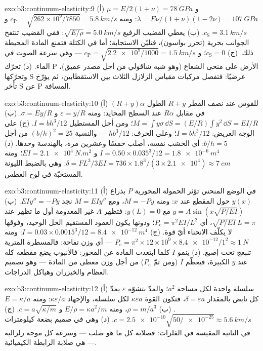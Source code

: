 \begin{solution}{exo:b3:continuum-elasticity:9}
(أ) $\mu = E/2(1+\nu) = \qty{78}{GPa}$ و $\lambda = E\nu/(1+\nu)(1-2\nu)
= \qty{107}{GPa}$: ومنه $c_{\text{P}} = \sqrt{262\times10^9/7850} =
\qty{5.8}{km/s}$ و $c_{\text{S}} = \qty{3.1}{km/s}$. (ب) يعطي القضيب
الرفيع $\sqrt{E/\rho} = \qty{5.0}{km/s}$: ففي القضيب تنتفخ الجوانب
بحرية (تحرر بواسون)، فتليّن الاستجابة؛ أما في الكتلة فتمنع المادة
المحيطة ذلك. (ج) $c_{\text{S}} = 0$؛ و
$c_{\text{P}} = \sqrt{\num{2.2e9}/1000} = \qty{1.5}{km/s}$ --- وهي
سرعة الصوت في الماء. (د) تحرّك P الأرض على منحى الشعاع
(وهو شبه شاقولي من أجل مصدر عميق)، وتحرّكها S عرضيًا: فتفصل
مركبات مقياس الزلازل الثلاث بين الاستقطابين، ثم يؤرّخ تأخر S عن P
المسافة.
\end{solution}

\begin{solution}{exo:b3:continuum-elasticity:10}
(أ) للقوس عند نصف القطر $R + y$ الطول $(R + y)\alpha$ في مقابل
$R\alpha$ عند السطح المحايد: ومنه $\varepsilon = y/R$ و $\sigma =
Ey/R$. (ب) $M = \int y\sigma\,\dd S = (E/R)\int y^2\,\dd S = EI/R$؛
ومن أجل المستطيل $I = bh^3/12$. (ج) على الوجه العريض: $I = bh^3/12$؛ وعلى الحرف:
$hb^3/12$ --- والنسبة $(b/h)^2 = 25$ من أجل $b/h = 5$: أي الخشب نفسه، أصلب
خمسًا وعشرين مرة، بالهندسة وحدها. (د) $I = 0.50 \times
0.035^3/12 = \qty{1.8e-6}{m^4}$ و $EI = \qty{2.1e4}{N.m^2}$؛ ومنه $\delta =
FL^3/3EI = 736 \times 1.8^3/(3 \times \num{2.1e4}) \approx
\qty{7}{cm}$: وهي بالضبط الليونة المستحبّة في لوح الغطس.
\end{solution}

\begin{solution}{exo:b3:continuum-elasticity:11}
(أ) في الوضع المنحني تؤثر الحمولة المحورية $P$ بذراع
$y(x)$ حول المقطع عند $x$: ومنه $M = -Py$، ومع $M = EIy''$ نجد
$EIy'' = -Py$. (ب) $y = A\sin(x\sqrt{P/EI})$ مع $y(L) = 0$: فتظهر
$A$ غير المعدومة أول ما تظهر عند $\sqrt{P/EI}\,L = \pi$، أي $P_{\text{c}} =
\pi^2EI/L^2$؛ ودونها يكون العمود المستقيم الحل الوحيد، وفوقها
لا يكلّف الانحناء أيّ قوة. (ج) $I = 0.03 \times 0.0015^3/12 =
\qty{8.4e-12}{m^4}$: ومنه $P_{\text{c}} = \pi^2 \times 12\times10^9 \times
\num{8.4e-12}/1^2 \approx \qty{1}{N}$ --- أي وزن تفاحة: فالمسطرة
المترية تنبعج تحت إصبع. (د) ينمو $I$ كلما ابتعدت المادة
عن المحور: فالأنبوب يضع مقطعه كله عند $y$ الكبيرة،
فيعظّم $I$ (ومن ثمّ $P_{\text{c}}$) من أجل وزن معطى من المادة
--- وهو تصميم العظام والخيزران وهياكل الدراجات.
\end{solution}

\begin{solution}{exo:b3:continuum-elasticity:12}
(أ) سلسلة واحدة لكل مساحة $a^2$؛ والمدّ بتشوّه $\varepsilon$
يمدّ كل نابض بالمقدار $\delta = \varepsilon a$، فتكون القوة $\kappa
\varepsilon a$ لكل سلسلة، والإجهاد $\kappa\varepsilon/a$: ومنه $E =
\kappa/a$. (ب) $\rho = m/a^3$، ومنه $E/\rho = \kappa a^2/m$ و $c =
a\sqrt{\kappa/m}$. (ج) $c = \num{2.5e-10}\sqrt{50/\num{e-25}} \approx
\qty{5.6}{km/s}$. (د) وهي في صميم بضعة كيلومترات في الثانية
المقيسة في الفلزات: فصلابة كل ما هو صلب --- وسرعة كل موجة
زلزالية --- هي صلابة الرابطة الكيميائية.
\end{solution}

